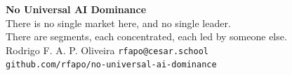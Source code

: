 \documentclass[aspectratio=169,11pt]{beamer}
\begin{document}
\begin{frame}[plain]
  \vspace{2.2em}
  \begin{center}
    {\Large\textbf{No Universal AI Dominance}}\\[0.9em]
    {\color{mid} There is no single market here, and no single leader.}\\[0.4em]
    {\color{mid} There are segments, each concentrated, each led by someone else.}\\[2.0em]
    {\small Rodrigo F. A. P. Oliveira \quad\textbar\quad \texttt{rfapo@cesar.school}}\\[0.5em]
    {\footnotesize\color{mid}\texttt{github.com/rfapo/no-universal-ai-dominance}}
  \end{center}
\end{frame}
\end{document}
